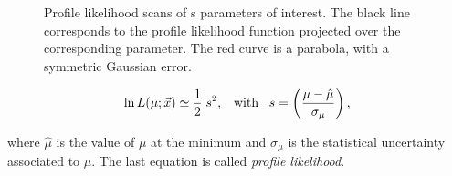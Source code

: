 \begin{figure}[!t]
  \centering
  \begin{subfigure}{0.5\textwidth}
    \raggedright
    \scalebox{0.56}{}
    \caption{}
    \label{nll_ACP0}
  \end{subfigure}%
  \hfill%
  \begin{subfigure}{0.5\textwidth}
    \raggedleft
    \scalebox{0.57}{}
    \caption{}
    \label{nll_ACPperp}
  \end{subfigure}
  \begin{subfigure}{0.5\textwidth}
    \raggedright
    \scalebox{0.56}{}
    \caption{}
    \label{nll_ACPpar}
  \end{subfigure}%
  \hfill%
  \begin{subfigure}{0.5\textwidth}
    \raggedleft
    \scalebox{0.56}{}
    \caption{}
    \label{nll_ACPS}
  \end{subfigure}
\caption{Profile likelihood scans of \Acp{} parameters of interest. The black line corresponds to the profile likelihood
         function projected over the corresponding parameter. The red curve is a parabola, with a symmetric Gaussian
         error.}
\end{figure}

\begin{equation}
\ln L(\mu;\vec{x}) \simeq \frac{1}{2} \; s^2, \;\;\; \text{with} \;\;\; s = \left( \frac{\mu-\hat{\mu}}{\sigma_{\mu}} \right),
\label{likelihood_exp}
\end{equation}

\noindent where $\hat{\mu}$ is the value of $\mu$ at the minimum and $\sigma_{\mu}$ is the statistical uncertainty associated
to $\mu$. The last equation is called {\it profile likelihood}.

